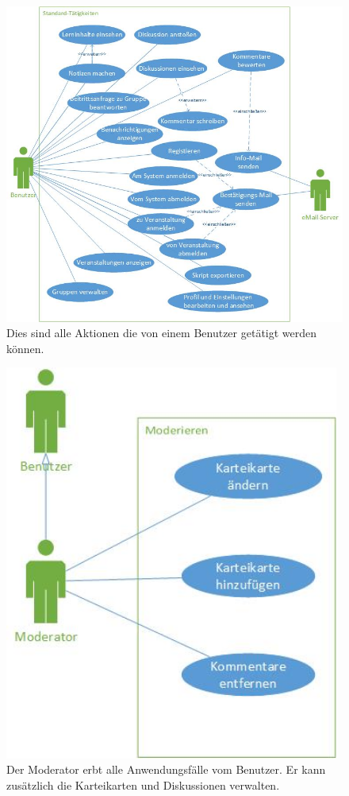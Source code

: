 \documentclass[12pt,a4paper]{article}
\begin{document}
\begin{figure}[H]
	\centering
	\includegraphics[width=\textwidth]{Bilder/Anwendungsfalldiagramme/Benutzer.jpg}
	\caption{Dies sind alle Aktionen die von einem Benutzer getätigt werden können.}
	\label{AwfBenutzer}
\end{figure}

\begin{figure}[H]
	\centering
	\includegraphics[height=13cm]{Bilder/Anwendungsfalldiagramme/Moderator.jpg}
	\caption{Der Moderator erbt alle Anwendungsfälle vom Benutzer. Er kann zusätzlich die Karteikarten und Diskussionen verwalten.}
	\label{AwfModerator}
\end{figure}
\end{document}
